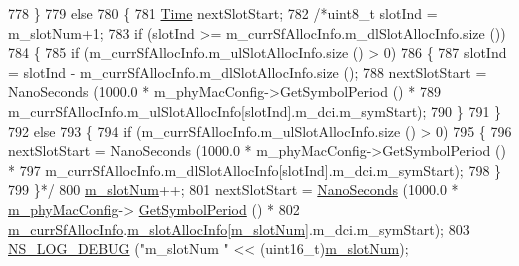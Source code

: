 \begin{DoxyCode}
778         \}
779         \textcolor{keywordflow}{else}
780         \{
781                 \hyperlink{namespacens3_1_1TracedValueCallback_a7ffd3e7c142ffe7c8a1d2db9b8de38ec}{Time} nextSlotStart;
782                 \textcolor{comment}{/*uint8\_t slotInd = m\_slotNum+1;}
783 \textcolor{comment}{                if (slotInd >= m\_currSfAllocInfo.m\_dlSlotAllocInfo.size ())}
784 \textcolor{comment}{                \{}
785 \textcolor{comment}{                        if (m\_currSfAllocInfo.m\_ulSlotAllocInfo.size () > 0)}
786 \textcolor{comment}{                        \{}
787 \textcolor{comment}{                                slotInd = slotInd - m\_currSfAllocInfo.m\_dlSlotAllocInfo.size ();}
788 \textcolor{comment}{                                nextSlotStart = NanoSeconds (1000.0 * m\_phyMacConfig->GetSymbolPeriod () *}
789 \textcolor{comment}{                                                            
       m\_currSfAllocInfo.m\_ulSlotAllocInfo[slotInd].m\_dci.m\_symStart);}
790 \textcolor{comment}{                        \}}
791 \textcolor{comment}{                \}}
792 \textcolor{comment}{                else}
793 \textcolor{comment}{                \{}
794 \textcolor{comment}{                        if (m\_currSfAllocInfo.m\_ulSlotAllocInfo.size () > 0)}
795 \textcolor{comment}{                        \{}
796 \textcolor{comment}{                                nextSlotStart = NanoSeconds (1000.0 * m\_phyMacConfig->GetSymbolPeriod () *}
797 \textcolor{comment}{                                                            
       m\_currSfAllocInfo.m\_dlSlotAllocInfo[slotInd].m\_dci.m\_symStart);}
798 \textcolor{comment}{                        \}}
799 \textcolor{comment}{                \}*/}
800                 \hyperlink{classns3_1_1MmWavePhy_a6c83cdb8c36a9a58ae8b9f17933680ac}{m\_slotNum}++;
801                 nextSlotStart = \hyperlink{group__timecivil_ga281d64bcb4dad96267d83c7688ec433f}{NanoSeconds} (1000.0 * \hyperlink{classns3_1_1MmWavePhy_a869abf36bbdbb94eed77ba6e4846f6e4}{m\_phyMacConfig}->
      \hyperlink{classns3_1_1MmWavePhyMacCommon_a1048fa4a24a72abc5d4d982efd6c21af}{GetSymbolPeriod} () *
802                                                                              
      \hyperlink{classns3_1_1MmWaveUePhy_ac557b99a2b425df99cb8d827f939df90}{m\_currSfAllocInfo}.\hyperlink{structns3_1_1SfAllocInfo_a6a87109ff89bf270a74ff95a5bbf9231}{m\_slotAllocInfo}[\hyperlink{classns3_1_1MmWavePhy_a6c83cdb8c36a9a58ae8b9f17933680ac}{m\_slotNum}].m\_dci.m\_symStart);
803                 \hyperlink{group__logging_ga413f1886406d49f59a6a0a89b77b4d0a}{NS\_LOG\_DEBUG} (\textcolor{stringliteral}{"m\_slotNum "} << (uint16\_t)\hyperlink{classns3_1_1MmWavePhy_a6c83cdb8c36a9a58ae8b9f17933680ac}{m\_slotNum});

\end{DoxyCode}
